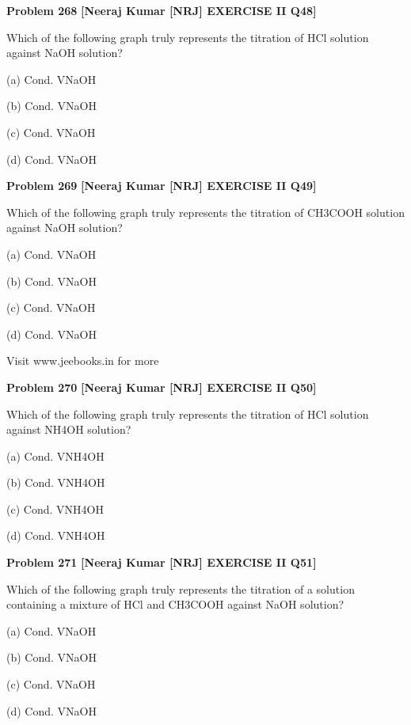 \begin{problembox}
\textbf{Problem 268} \hfill \textbf{[Neeraj Kumar [NRJ] EXERCISE II Q48]}
\label{q:ext-nrj_all_questions-268}

Which of the following graph truly represents the 
titration of HCl solution against NaOH solution?
 
 (a) 
Cond.
VNaOH
 
 (b) 
Cond.
VNaOH
 
 (c) 
Cond.
VNaOH
 
 (d) 
Cond.
VNaOH
\end{problembox}

\begin{problembox}
\textbf{Problem 269} \hfill \textbf{[Neeraj Kumar [NRJ] EXERCISE II Q49]}
\label{q:ext-nrj_all_questions-269}

Which of the following graph truly represents the 
titration of CH3COOH solution against NaOH 
solution?
 
 (a) 
Cond.
VNaOH
 
 (b) 
Cond.
VNaOH
 
 (c) 
Cond.
VNaOH
 
 (d) 
Cond.
VNaOH
 
 
Visit www.jeebooks.in for more
\end{problembox}

\begin{problembox}
\textbf{Problem 270} \hfill \textbf{[Neeraj Kumar [NRJ] EXERCISE II Q50]}
\label{q:ext-nrj_all_questions-270}

Which of the following graph truly represents 
the titration of HCl solution against NH4OH 
solution?
 
 (a) 
Cond.
VNH4OH
 
 (b) 
Cond.
VNH4OH
 
 (c) 
Cond.
VNH4OH
 
 (d) 
Cond.
VNH4OH
\end{problembox}

\begin{problembox}
\textbf{Problem 271} \hfill \textbf{[Neeraj Kumar [NRJ] EXERCISE II Q51]}
\label{q:ext-nrj_all_questions-271}

Which of the following graph truly represents the 
titration of a solution containing a mixture of 
HCl and CH3COOH against NaOH solution?
 
 (a) 
Cond.
VNaOH
 
 (b) 
Cond.
VNaOH
 
 (c) 
Cond.
VNaOH
 
 (d) 
Cond.
VNaOH
\end{problembox}

